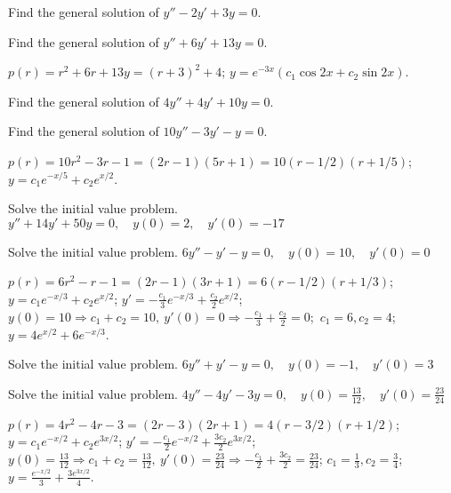 \documentclass{ximera}
\begin{document}
\begin{problem}\label{exer:5.2.9}  Find the general solution of $y''-2y'+3y=0$.
\end{problem}  

\begin{problem}\label{exer:5.2.10}  Find the general solution of $y''+6y'+13y=0$.
\begin{solution}
$p(r)=r^2+6r+13y=(r+3)^2+4$;\;
 $y=e^{-3x}(c_1\cos 2x+c_2\sin 2x)$.
\end{solution}
\end{problem} 

\begin{problem}\label{exer:5.2.11}  Find the general solution of $4y''+4y'+10y=0$.
\end{problem}

\begin{problem}\label{exer:5.2.12}  Find the general solution of $10y''-3y'-y=0$.
\begin{solution}
$p(r)=10r^2-3r-1=(2r-1)(5r+1)=10(r-1/2)
(r+1/5)$;\;
$y=c_1e^{-x/5}+c_2e^{x/2}$.
\end{solution}
\end{problem} 

\begin{problem}\label{exer:5.2.13}  Solve
the initial value problem.
$y''+14y'+50y=0, \quad  y(0)=2,\quad y'(0)=-17$
\end{problem} 

\begin{problem}\label{exer:5.2.14}  Solve
the initial value problem.
$6y''-y'-y=0, \quad  y(0)=10,\quad y'(0)=0$
\begin{solution}
$p(r)=6r^2-r-1=(2r-1)(3r+1)=6(r-1/2) (r+1/3)$;\;
$y=c_1e^{-x/3}+c_2e^{x/2}$;\;
$y'=-\frac{c_1}{3}e^{-x/3}+\frac{c_2}{2}e^{x/2}$;\;
 $y(0)=10\Rightarrow c_1+c_2=10,\ y'(0)=0\Rightarrow -\frac{c_1}{3}
+\frac{c_2}{2}=0$;\ $c_1=6, c_2=4$;\;
$y=4e^{x/2}+6e^{-x/3}$.
\end{solution}
\end{problem} 

\begin{problem}\label{exer:5.2.15}  Solve
the initial value problem.
$6y''+y'-y=0, \quad  y(0)=-1,\quad y'(0)=3$
\end{problem} 

\begin{problem}\label{exer:5.2.16}  Solve
the initial value problem.
$4y''-4y'-3y=0, \quad  y(0)=\frac{13}{12},\quad y'(0)=\frac{23}{24}$
\begin{solution}
$p(r)=4r^2-4r-3=(2r-3)(2r+1)= 4(r-3/2)(r+1/2)$;
$y=c_1e^{-x/2} +c_2e^{3x/2}$;\;
$y'=-\frac{c_1}{2}e^{-x/2} +\frac{3c_2}{2}e^{3x/2}$;\;
 $y(0)=\frac{13}{12}\Rightarrow c_1+c_2=\frac{13}{12},\
y'(0)=\frac{23}{24}\Rightarrow
-\frac{c_1}{2}+\frac{3c_2}{2}=\frac{23}{24}$;\;
$c_1=\frac{1}{3}, c_2=\frac{3}{4}$;\;
$y=\frac{e^{-x/2}}{3}+\frac{3e^{3x/2}}{4}$.
\end{solution}
\end{problem} 
\end{document}

